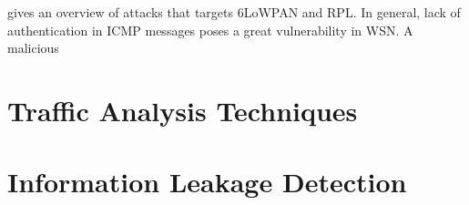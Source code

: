 \cite{6lpRplAtk} gives an overview of attacks that targets 6LoWPAN and RPL. In general, lack of authentication in ICMP messages poses a great vulnerability in WSN. A malicious 





\section{Traffic Analysis Techniques}

\section{Information Leakage Detection}

